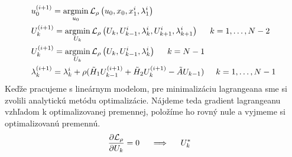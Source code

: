 \begin{align}
&u_{0}^{(i+1)} = \operatorname*{argmin}_{u_{0}} \mathcal{L}_{\rho} \left(u_{0},x_{0},x_{1}^{i},\lambda_{1}^{i}\right)\\
&U_{k}^{(i+1)} = \operatorname*{argmin}_{U_{k}} \mathcal{L}_{\rho} \left(U_{k},U_{k-1}^{i},\lambda_{k}^{i},U_{k+1}^{i},\lambda_{k+1}^{i}\right) \hspace{0.5cm} k=1,\dots,N-2\\
&U_{k}^{(i+1)} = \operatorname*{argmin}_{U_{k}} \mathcal{L}_{\rho}\left(U_{k},U_{k-1}^{i},\lambda_{k}^{i}\right) \hspace{0.5cm} k=N-1\\
&\lambda_{k}^{(i+1)} = \lambda_{k}^{i} + \rho( \tilde{H}_{1}U_{k-1}^{(i+1)} + \tilde{H}_{2}U_{k}^{(i+1)} - \tilde{A}U_{k-1})\hspace{0.5cm} k=1,\dots,N-1
\end{align}
Keďže pracujeme s lineárnym modelom, pre minimalizáciu lagrangeana sme si zvolili analytickú metódu optimalizácie. Nájdeme teda gradient lagrangeanu vzhľadom k optimalizovanej premennej, položíme ho rovný nule a vyjmeme si optimalizovanú premennú.
\begin{align}
&\frac{\partial \mathcal{L}_{\rho}}{\partial U_{k}} = 0  \hspace{0.5cm} \Longrightarrow  \hspace{0.5cm} U_{k}^{*}	
\end{align}

